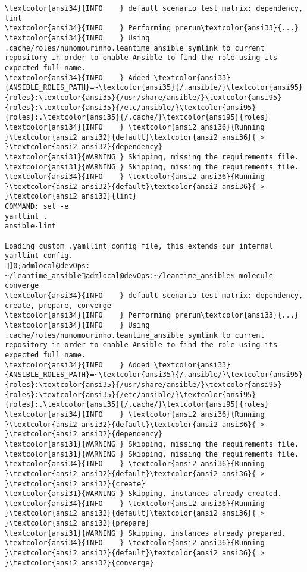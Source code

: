 \documentclass{scrartcl}
\begin{document}
\begin{Verbatim}
\textcolor{ansi34}{INFO    } default scenario test matrix: dependency, lint
\textcolor{ansi34}{INFO    } Performing prerun\textcolor{ansi33}{...}
\textcolor{ansi34}{INFO    } Using .cache/roles/nunomourinho.leantime_ansible symlink to current repository in order to enable Ansible to find the role using its expected full name.
\textcolor{ansi34}{INFO    } Added \textcolor{ansi33}{ANSIBLE_ROLES_PATH}=~\textcolor{ansi35}{/.ansible/}\textcolor{ansi95}{roles}:\textcolor{ansi35}{/usr/share/ansible/}\textcolor{ansi95}{roles}:\textcolor{ansi35}{/etc/ansible/}\textcolor{ansi95}{roles}:.\textcolor{ansi35}{/.cache/}\textcolor{ansi95}{roles}
\textcolor{ansi34}{INFO    } \textcolor{ansi2 ansi36}{Running }\textcolor{ansi2 ansi32}{default}\textcolor{ansi2 ansi36}{ > }\textcolor{ansi2 ansi32}{dependency}
\textcolor{ansi31}{WARNING } Skipping, missing the requirements file.
\textcolor{ansi31}{WARNING } Skipping, missing the requirements file.
\textcolor{ansi34}{INFO    } \textcolor{ansi2 ansi36}{Running }\textcolor{ansi2 ansi32}{default}\textcolor{ansi2 ansi36}{ > }\textcolor{ansi2 ansi32}{lint}
COMMAND: set -e
yamllint .
ansible-lint

Loading custom .yamllint config file, this extends our internal yamllint config.
]0;admlocal@devOps: ~/leantime_ansibleadmlocal@devOps:~/leantime_ansible$ molecule converge
\textcolor{ansi34}{INFO    } default scenario test matrix: dependency, create, prepare, converge
\textcolor{ansi34}{INFO    } Performing prerun\textcolor{ansi33}{...}
\textcolor{ansi34}{INFO    } Using .cache/roles/nunomourinho.leantime_ansible symlink to current repository in order to enable Ansible to find the role using its expected full name.
\textcolor{ansi34}{INFO    } Added \textcolor{ansi33}{ANSIBLE_ROLES_PATH}=~\textcolor{ansi35}{/.ansible/}\textcolor{ansi95}{roles}:\textcolor{ansi35}{/usr/share/ansible/}\textcolor{ansi95}{roles}:\textcolor{ansi35}{/etc/ansible/}\textcolor{ansi95}{roles}:.\textcolor{ansi35}{/.cache/}\textcolor{ansi95}{roles}
\textcolor{ansi34}{INFO    } \textcolor{ansi2 ansi36}{Running }\textcolor{ansi2 ansi32}{default}\textcolor{ansi2 ansi36}{ > }\textcolor{ansi2 ansi32}{dependency}
\textcolor{ansi31}{WARNING } Skipping, missing the requirements file.
\textcolor{ansi31}{WARNING } Skipping, missing the requirements file.
\textcolor{ansi34}{INFO    } \textcolor{ansi2 ansi36}{Running }\textcolor{ansi2 ansi32}{default}\textcolor{ansi2 ansi36}{ > }\textcolor{ansi2 ansi32}{create}
\textcolor{ansi31}{WARNING } Skipping, instances already created.
\textcolor{ansi34}{INFO    } \textcolor{ansi2 ansi36}{Running }\textcolor{ansi2 ansi32}{default}\textcolor{ansi2 ansi36}{ > }\textcolor{ansi2 ansi32}{prepare}
\textcolor{ansi31}{WARNING } Skipping, instances already prepared.
\textcolor{ansi34}{INFO    } \textcolor{ansi2 ansi36}{Running }\textcolor{ansi2 ansi32}{default}\textcolor{ansi2 ansi36}{ > }\textcolor{ansi2 ansi32}{converge}


\end{Verbatim}
\end{document}
